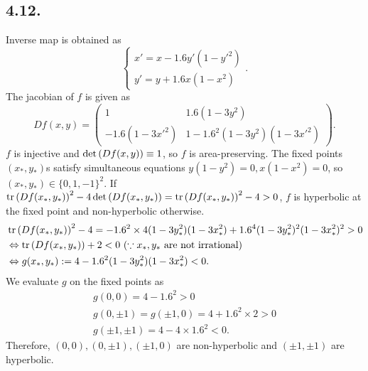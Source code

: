 \documentclass[a4paper,11pt,fleqn]{article}
\begin{document}
\maketitle
\subsection{4.12.}
Inverse map is obtained as
\begin{equation}
    \left\lbrace\begin{array}{c}
        x' = x - 1.6y'(1-y'^2) \\
        y' = y + 1.6x(1-x^2)
    \end{array}\right. .
\end{equation}
The jacobian of $f$ is given as 
\begin{equation}
    Df(x,y) = \left(\begin{array}{cc}
        1 & 1.6(1-3y^2) \\
        -1.6(1-3x'^2) & 1-1.6^2(1-3y^2)(1-3x'^2)
    \end{array} \right). 
\end{equation}
$f$ is injective and $\mathop{\rm det}{(Df(x,y))}\equiv 1$, so $f$ is area-preserving. 
The fixed points $(x_*,y_*)$s satisfy simultaneous equations $y(1-y^2)=0, x(1-x^2)=0$, so $(x_*,y_*) \in \{0,1,-1\}^2$. If $\mathop{\rm tr}{(Df(x_*,y_*))}^2-4 \mathop{\rm det}{(Df(x_*,y_*))} = \mathop{\rm tr}{(Df(x_*,y_*))}^2 - 4 > 0$, $f$ is hyperbolic at the fixed point and non-hyperbolic otherwise. 
\begin{align}
    &\mathop{\rm tr}{(Df(x_*,y_*))}^2 - 4 = -1.6^2\times 4(1-3y_*^2)(1-3x_*^2) + 1.6^4(1-3y_*^2)^2(1-3x_*^2)^2 > 0 \nonumber \\
    &\Leftrightarrow \mathop{\rm tr}{(Df(x_*,y_*))} + 2 <0 \ (\because x_*, y_* \text{ are not irrational} ) \nonumber \\
    &\Leftrightarrow g(x_*,y_*):= 4 -1.6^2(1-3y_*^2)(1-3x_*^2) <0. 
\end{align}
We evaluate $g$ on the fixed points as 
\begin{align}
    g(0,0) = 4 - 1.6^2 >0 \nonumber \\
    g(0,\pm 1) = g(\pm 1,0) = 4+1.6^2\times2 >0 \nonumber \\
    g(\pm 1,\pm 1) = 4-4\times 1.6^2 <0 .
\end{align}
Therefore, $(0,0), (0,\pm 1), (\pm 1,0)$ are non-hyperbolic and $(\pm 1,\pm 1)$ are hyperbolic. 
\hruleskip
\end{document}
